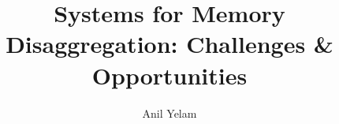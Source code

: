 \documentclass[sigconf, nonacm, 11pt]{acmart}
\begin{document}
\title[Systems for Memory Disaggregation: Challenges \& Opportunities ]
{Systems for Memory Disaggregation: Challenges \& Opportunities} %
\author{Anil Yelam}

\sloppy


\maketitle


% 






% 
% 



\end{document}
